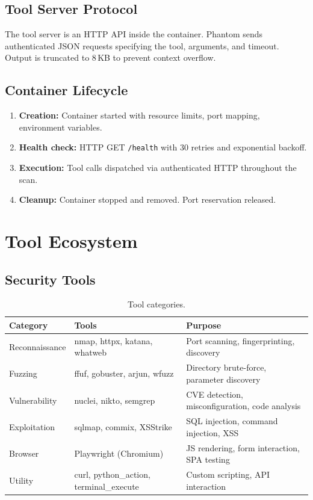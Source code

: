 \documentclass[12pt,a4paper]{report}
\begin{document}
\section{Tool Server Protocol}

The tool server is an HTTP API inside the container. Phantom sends authenticated JSON requests specifying the tool, arguments, and timeout. Output is truncated to 8\,KB to prevent context overflow.

\section{Container Lifecycle}

\begin{enumerate}
    \item \textbf{Creation:} Container started with resource limits, port mapping, environment variables.
    \item \textbf{Health check:} HTTP GET \texttt{/health} with 30 retries and exponential backoff.
    \item \textbf{Execution:} Tool calls dispatched via authenticated HTTP throughout the scan.
    \item \textbf{Cleanup:} Container stopped and removed. Port reservation released.
\end{enumerate}


\chapter{Tool Ecosystem}

\section{Security Tools}

\begin{table}[H]
\centering
\caption{Tool categories.}
\begin{tabularx}{\textwidth}{llX}
\toprule
\textbf{Category} & \textbf{Tools} & \textbf{Purpose} \\
\midrule
Reconnaissance & nmap, httpx, katana, whatweb & Port scanning, fingerprinting, discovery \\
Fuzzing        & ffuf, gobuster, arjun, wfuzz & Directory brute-force, parameter discovery \\
Vulnerability  & nuclei, nikto, semgrep & CVE detection, misconfiguration, code analysis \\
Exploitation   & sqlmap, commix, XSStrike & SQL injection, command injection, XSS \\
Browser        & Playwright (Chromium) & JS rendering, form interaction, SPA testing \\
Utility        & curl, python\_action, terminal\_execute & Custom scripting, API interaction \\
\bottomrule
\end{tabularx}
\end{table}
\end{document}
